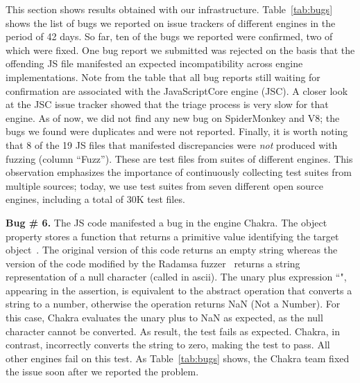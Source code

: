 \documentclass[10pt,conference,anonymous]{IEEEtran}
\begin{document}

This section shows results obtained with our
infrastructure. Table~\ref{tab:bugs} shows the list of bugs we
reported on issue trackers of different engines in the period of 42
days. So far, ten of the bugs we reported
were confirmed, two of which were fixed. One bug report we
submitted was rejected on the basis that the offending JS file
manifested an expected incompatibility across engine
implementations.
Note from the table that all bug
reports still waiting for confirmation are associated with the
JavaScriptCore engine (JSC). A closer look at the JSC issue tracker
showed that the triage process is very slow for that engine. As of
now, we did not find any new bug on SpiderMonkey and V8; the bugs we
found were duplicates and were not reported. Finally, it is
worth noting that 8 of the 19 JS files that manifested
discrepancies were \emph{not} produced with fuzzing (column
``Fuzz''). These are test files from suites of different engines. This
observation emphasizes the importance of continuously collecting test suites from
multiple sources; today, we use test suites from seven different open
source engines, including a total of 30K test files.

 

\vspace{1ex}\noindent\textbf{Bug \# 6.} The JS code  
manifested a bug in the \js{} engine Chakra.  The object
property  stores a function that returns a primitive
value identifying the target object~\cite{valueof}. The original
version of this code returns an empty string whereas the version of
the code modified by the Radamsa fuzzer~\cite{radamsa} returns a string
representation of a null character (called  in ascii). The
unary plus expression ``", appearing in the assertion, is
equivalent to the abstract operation 
that converts a string to a number, otherwise the operation returns
NaN (Not a Number)\cite{unary-plus}. For this case, Chakra evaluates
the unary plus to NaN as expected, as the null character cannot be
converted. As result, the test fails as expected. Chakra, in contrast,
incorrectly converts the string to zero, making the test to pass. All
other engines fail on this test. As Table~\ref{tab:bugs} shows, the
Chakra team fixed the issue soon after we reported the problem.
\end{document}
